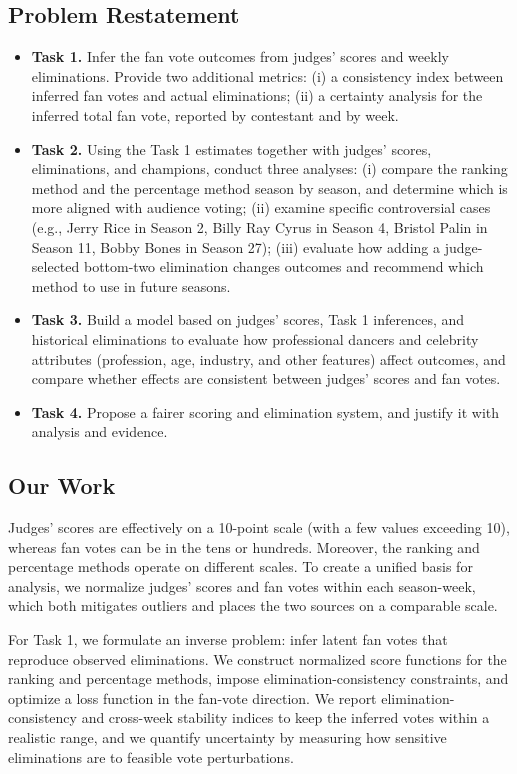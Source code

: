 \subsection{Problem Restatement}
\begin{itemize}
    \item \textbf{Task 1.} Infer the fan vote outcomes from judges' scores and weekly eliminations. Provide two additional metrics: (i) a consistency index between inferred fan votes and actual eliminations; (ii) a certainty analysis for the inferred total fan vote, reported by contestant and by week.
    \item \textbf{Task 2.} Using the Task 1 estimates together with judges' scores, eliminations, and champions, conduct three analyses: (i) compare the ranking method and the percentage method season by season, and determine which is more aligned with audience voting; (ii) examine specific controversial cases (e.g., Jerry Rice in Season 2, Billy Ray Cyrus in Season 4, Bristol Palin in Season 11, Bobby Bones in Season 27); (iii) evaluate how adding a judge-selected bottom-two elimination changes outcomes and recommend which method to use in future seasons.
    \item \textbf{Task 3.} Build a model based on judges' scores, Task 1 inferences, and historical eliminations to evaluate how professional dancers and celebrity attributes (profession, age, industry, and other features) affect outcomes, and compare whether effects are consistent between judges' scores and fan votes.
    \item \textbf{Task 4.} Propose a fairer scoring and elimination system, and justify it with analysis and evidence.
\end{itemize}

\subsection{Our Work}
Judges' scores are effectively on a 10-point scale (with a few values exceeding 10), whereas fan votes can be in the tens or hundreds. Moreover, the ranking and percentage methods operate on different scales. To create a unified basis for analysis, we normalize judges' scores and fan votes within each season-week, which both mitigates outliers and places the two sources on a comparable scale.

For Task 1, we formulate an inverse problem: infer latent fan votes that reproduce observed eliminations. We construct normalized score functions for the ranking and percentage methods, impose elimination-consistency constraints, and optimize a loss function in the fan-vote direction. We report elimination-consistency and cross-week stability indices to keep the inferred votes within a realistic range, and we quantify uncertainty by measuring how sensitive eliminations are to feasible vote perturbations.

